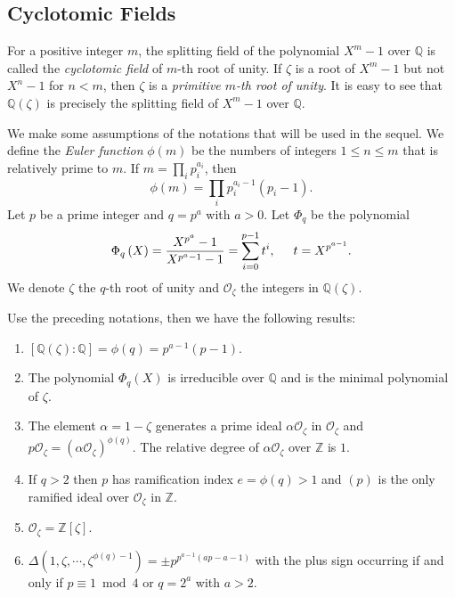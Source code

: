 \subsection{Cyclotomic Fields}
For a positive integer $m$, the splitting field of the polynomial $X^m-1$ over $\mathbb{Q}$ is called the \textit{cyclotomic field} of $m$-th root of unity. If $\zeta$ is a root of $X^m-1$ but not $X^n-1$ for $n<m$, then $\zeta$ is a \textit{primitive $m$-th root of unity}. It is easy to see that $\mathbb{Q}(\zeta)$ is precisely the splitting field of $X^m-1$ over $\mathbb{Q}$.\par
We make some assumptions of the notations that will be used in the sequel. We define the \textit{Euler function} $\phi(m)$ be the numbers of integers $1\le n\le m$ that is relatively prime to $m$. If $m=\prod_ip_i^{a_i}$, then 
$$
\phi \left( m \right) =\prod_i{p_{i}^{a_i-1}\left( p_i-1 \right)}.
$$
Let $p$ be a prime integer and $q=p^a$ with $a>0$. Let $\Phi_q$ be the polynomial 
$$
\Phi _q\left( X \right) =\frac{X^{p^a}-1}{X^{p^a-1}-1}=\sum_{i=0}^{p-1}{t^i},\hspace{0.5cm}t=X^{p^{a-1}}.
$$
We denote $\zeta$ the $q$-th root of unity and $\mathcal{O}_\zeta$ the integers in $\mathbb{Q}(\zeta)$.
\begin{theorem}
Use the preceding notations, then we have the following results:
\begin{enumerate}
    \item $[\mathbb{Q}(\zeta):\mathbb{Q}]=\phi(q)=p^{a-1}(p-1)$.
    \item The polynomial $\Phi_q(X)$ is irreducible over $\mathbb{Q}$ and is the minimal polynomial of $\zeta$.
    \item The element $\alpha=1-\zeta$ generates a prime ideal $\alpha\mathcal{O}_\zeta$ in $\mathcal{O}_\zeta$ and $p\mathcal{O}_\zeta=(\alpha\mathcal{O}_\zeta)^{\phi(q)}$. The relative degree of $\alpha\mathcal{O}_\zeta$ over $\mathbb{Z}$ is $1$.
    \item If $q>2$ then $p$ has ramification index $e=\phi(q)>1$ and $(p)$ is the only ramified ideal over $\mathcal{O}_\zeta$ in $\mathbb{Z}$.
    \item $\mathcal{O}_\zeta=\mathbb{Z}[\zeta]$.
    \item $\Delta(1,\zeta,\cdots,\zeta^{\phi(q)-1})=\pm p^{p^{a-1}(ap-a-1)}$ with the plus sign occurring if and only if $p\equiv 1\bmod{4}$ or $q=2^a$ with $a>2$.
\end{enumerate}
\end{theorem}
